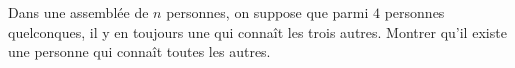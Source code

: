 Dans une assemblée de $n$ personnes, on suppose que parmi $4$ personnes quelconques, il y en toujours une qui connaît les trois autres. Montrer qu'il existe une personne qui connaît toutes les autres.
